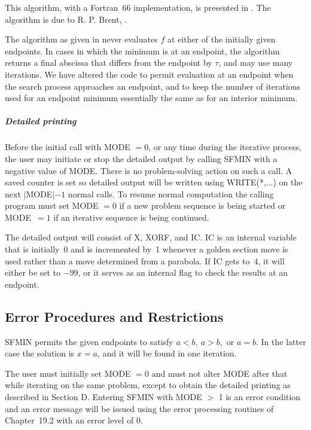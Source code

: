 \documentclass[twoside]{MATH77}
\begin{document}
This algorithm, with a Fortran~66 implementation, is presented in
\cite{Forsythe:1977:CMM}.  The algorithm is due to R.  P.  Brent,
\cite{Brent:1973:AMW}.

The algorithm as given in \cite{Forsythe:1977:CMM} never evaluates $f$ at
either of the initially given endpoints.  In cases in which the minimum is
at an endpoint, the algorithm returns a final abscissa that differs from
the endpoint by $\tau $, and may use many iterations.  We have altered
the code to permit evaluation at an endpoint when the search process
approaches an endpoint, and to keep the number of iterations used for an
endpoint minimum essentially the same as for an interior minimum.

\subparagraph{Detailed printing}

Before the initial call with MODE $= 0$, or any time during the iterative
process, the user may initiate or stop the detailed output by calling SFMIN
with a negative value of MODE. There is no problem-solving action on such a
call. A saved counter is set so detailed output will be written using
WRITE(*,...) on the next $|$MODE$|-1$ normal calls. To resume normal
computation the calling program must set MODE $= 0$ if a new problem
sequence is being started or MODE\ $= 1$ if an iterative sequence is being
continued.

The detailed output will consist of X, XORF, and IC. IC is an internal variable
that is initially~0 and is incremented by~1 whenever a golden section move
is used rather than a move determined from a parabola. If IC gets to~4, it
will either be set to $-$99, or it serves as an internal flag to check the
results at an endpoint.




\subsection{Error Procedures and Restrictions}

SFMIN permits the given endpoints to satisfy $a < b,\ a > b,\text{ or }a = b$.
In the latter case the solution is $x = a$, and it will be found in one
iteration.

The user must initially set MODE $= 0$ and must not alter MODE after that
while iterating on the same problem, except to obtain the detailed
printing as described in Section D. Entering SFMIN with MODE $>$ 1
is an error condition and an error message will be issued using the
error processing routines of Chapter~19.2 with an error level of 0.
\end{document}
